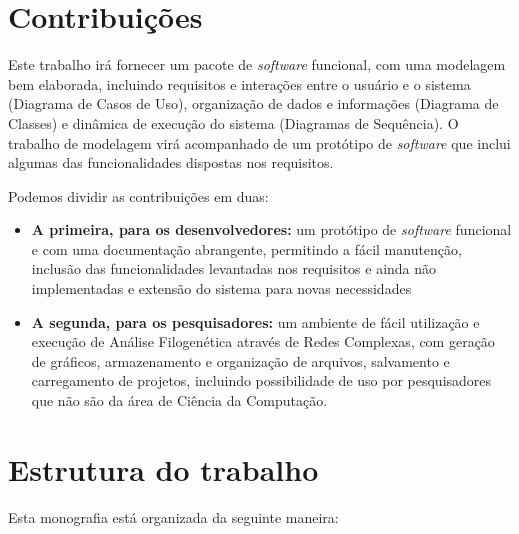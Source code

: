 
\section{Contribuições}

Este trabalho irá fornecer um pacote de \textit{software} funcional, com uma modelagem bem elaborada, incluindo requisitos e interações entre o usuário
e o sistema (Diagrama de Casos de Uso), organização de dados e informações (Diagrama de Classes) e dinâmica de execução do sistema (Diagramas de Sequência).
O trabalho de modelagem virá acompanhado de um protótipo de \textit{software} que inclui algumas das funcionalidades dispostas nos requisitos.

Podemos dividir as contribuições em duas:

\begin{itemize}
  \item{\textbf{A primeira, para os desenvolvedores:} um protótipo de \textit{software} funcional e com uma documentação abrangente, permitindo a fácil
manutenção, inclusão das funcionalidades levantadas nos requisitos e ainda não implementadas e extensão do sistema para novas necessidades}
  \item{\textbf{A segunda, para os pesquisadores:} um ambiente de fácil utilização e execução de Análise Filogenética através de Redes Complexas, com
geração de gráficos, armazenamento e organização de arquivos, salvamento e carregamento de projetos, incluindo possibilidade de uso por pesquisadores
que não são da área de Ciência da Computação.}
\end{itemize}


\section{Estrutura do trabalho}

Esta monografia está organizada da seguinte maneira:

